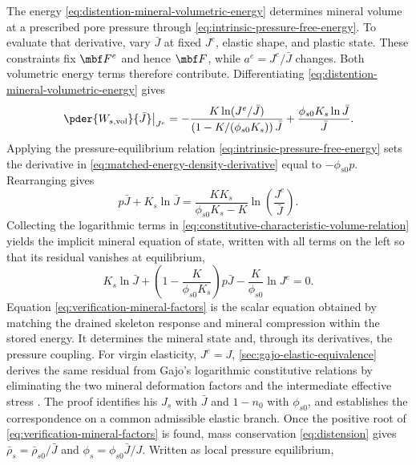 The energy \eqref{eq:distention-mineral-volumetric-energy} determines mineral volume at a prescribed pore
pressure through \eqref{eq:intrinsic-pressure-free-energy}.  To evaluate
that derivative, vary \(\bar J\) at fixed \(J^e\), elastic shape,
and plastic state.  These constraints fix \(\mbf F^e\) and hence
\(\mbf F\), while \(a^e=J^e/\bar J\) changes.  Both volumetric energy
terms therefore contribute.  Differentiating
\eqref{eq:distention-mineral-volumetric-energy} gives
\begin{equation}
 \left.\pder{W_{s,\mathrm{vol}}}{\bar J}\right|_{J^e}
 =-\frac{K\ln(J^e/\bar J)}
 {\left(1-K/(\phi_{s0}K_s)\right)\bar J}
 +\frac{\phi_{s0}K_s\ln\bar J}{\bar J}.
 \label{eq:matched-energy-density-derivative}
\end{equation}
Applying the pressure-equilibrium relation
\eqref{eq:intrinsic-pressure-free-energy} sets the derivative in
\eqref{eq:matched-energy-density-derivative} equal to
\(-\phi_{s0}p\).  Rearranging gives
\begin{equation}
 p\bar J+K_s\ln\bar J
 =\frac{KK_s}{\phi_{s0}K_s-K}\ln\left(\frac{J^e}{\bar J}\right).
 \label{eq:constitutive-characteristic-volume-relation}
\end{equation}
Collecting the logarithmic terms in
\eqref{eq:constitutive-characteristic-volume-relation} yields the implicit
mineral equation of state, written with all terms on the left so that its
residual vanishes at equilibrium,
\begin{equation}
 \boxed{
 K_s\ln\bar J
 +\left(1-\frac{K}{\phi_{s0}K_s}\right)p\bar J
 -\frac{K}{\phi_{s0}}\ln J^e=0.}
 \label{eq:verification-mineral-factors}
\end{equation}
Equation \eqref{eq:verification-mineral-factors} is the scalar equation
obtained by matching the drained skeleton response and mineral compression
within the stored energy.  It determines the mineral state and, through its
derivatives, the pressure coupling.  For virgin elasticity, \(J^e=J\),
\cref{sec:gajo-elastic-equivalence} derives the same residual from Gajo's
logarithmic constitutive relations by eliminating the two mineral
deformation factors and the intermediate effective stress
\citep[Eqs.~(3.27), (3.32), and (3.34)]{gajo2010}.  The proof identifies
his \(J_s\) with \(\bar J\) and \(1-n_0\) with \(\phi_{s0}\), and
establishes the correspondence on a common admissible elastic branch.
Once the positive root of \eqref{eq:verification-mineral-factors} is found,
mass conservation \eqref{eq:distension} gives
\(\bar\rho_s=\bar\rho_{s0}/\bar J\) and
\(\phi_s=\phi_{s0}\bar J/J\).  Written as local pressure equilibrium,
